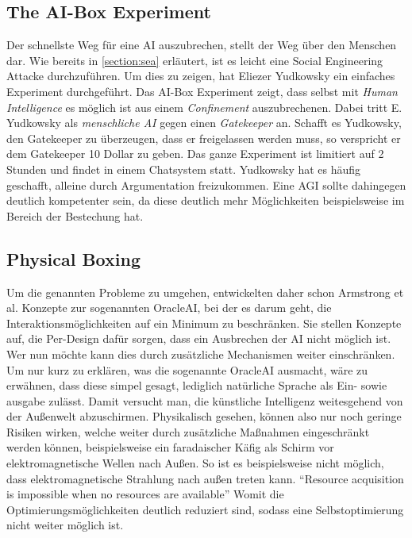         \subsection{The AI-Box Experiment}
        Der schnellste Weg für eine AI auszubrechen, stellt der Weg über den Menschen dar.\cite[p. 306]{armstrongforthcoming}
        Wie bereits in \ref{section:sea} erläutert, ist es leicht eine Social Engineering Attacke durchzuführen. Um dies
        zu zeigen, hat Eliezer Yudkowsky ein einfaches Experiment durchgeführt. Das AI-Box Experiment zeigt, dass selbst
        mit \textit{Human Intelligence} es möglich ist aus einem \textit{Confinement} auszubrechenen. Dabei tritt E.
        Yudkowsky als \textit{menschliche AI} gegen einen \textit{Gatekeeper} an. Schafft es Yudkowsky, den Gatekeeper
        zu überzeugen, dass er freigelassen werden muss, so verspricht er dem Gatekeeper 10 Dollar zu geben. Das ganze
        Experiment ist limitiert auf 2 Stunden und findet in einem Chatsystem statt. Yudkowsky hat es häufig geschafft,
        alleine durch Argumentation freizukommen. Eine AGI sollte dahingegen deutlich kompetenter sein, da diese deutlich
        mehr Möglichkeiten beispielsweise im Bereich der Bestechung hat.

        \subsection{Physical Boxing}

        Um die genannten Probleme zu umgehen, entwickelten daher schon Armstrong et al. Konzepte zur sogenannten OracleAI,
        bei der es darum geht, die Interaktionsmöglichkeiten auf ein Minimum zu beschränken.\cite{armstrongforthcoming}
        Sie stellen Konzepte auf, die Per-Design dafür sorgen, dass ein Ausbrechen der AI nicht möglich ist. Wer nun möchte
        kann dies durch zusätzliche Mechanismen weiter einschränken. Um nur kurz zu erklären, was die sogenannte OracleAI
        ausmacht, wäre zu erwähnen, dass diese simpel gesagt, lediglich natürliche Sprache als Ein- sowie ausgabe zulässt.
        Damit versucht man, die künstliche Intelligenz weitesgehend von der Außenwelt abzuschirmen. Physikalisch gesehen,
        können also nur noch geringe Risiken wirken, welche weiter durch zusätzliche Maßnahmen eingeschränkt werden können,
        beispielsweise ein faradaischer Käfig als Schirm vor elektromagnetische Wellen nach Außen. \cite[p. 308]{armstrongforthcoming}
        So ist es beispielsweise nicht möglich, dass elektromagnetische Strahlung nach außen treten kann.
        ``Resource acquisition is impossible when no resources are available'' \cite[p. 4]{ebhardt2018threat} Womit die
        Optimierungsmöglichkeiten deutlich reduziert sind, sodass eine Selbstoptimierung nicht weiter möglich ist.

